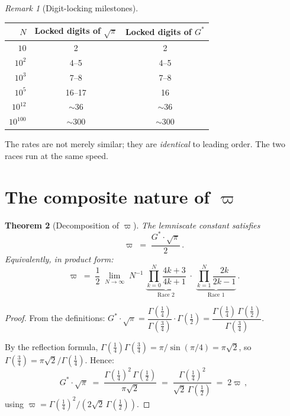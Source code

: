 \documentclass[12pt,reqno]{amsart}
\newtheorem{theorem}{Theorem}[section]
\theoremstyle{definition}
\theoremstyle{remark}
\newtheorem{remark}[theorem]{Remark}
\newcommand{\Gstar}{G^{\!*}}
\newcommand{\varpiup}{\varpi}
\begin{document}
\begin{remark}[Digit-locking milestones]\label{rem:milestones}
\begin{center}
\begin{tabular}{rcc}
\toprule
$N$ & Locked digits of $\sqrt{\pi}$ & Locked digits of $\Gstar$ \\
\midrule
$10$ & 2 & 2 \\
$10^{2}$ & 4--5 & 4--5 \\
$10^{3}$ & 7--8 & 7--8 \\
$10^{5}$ & 16--17 & 16 \\
$10^{12}$ & $\sim 36$ & $\sim 36$ \\
$10^{100}$ & $\sim 300$ & $\sim 300$ \\
\bottomrule
\end{tabular}
\end{center}
The rates are not merely similar; they are \emph{identical} to leading
order.  The two races run at the same speed.
\end{remark}


\section{The composite nature of $\varpiup$}

\begin{theorem}[Decomposition of $\varpiup$]\label{thm:composite}
The lemniscate constant satisfies
\begin{equation}\label{eq:composite}
  \varpiup \;=\; \frac{\Gstar\cdot\sqrt{\pi}}{2}\,.
\end{equation}
Equivalently, in product form:
\begin{equation}\label{eq:composite-product}
  \varpiup \;=\; \frac{1}{2}\;\lim_{N\to\infty}\;N^{-1}\;
  \underbrace{\prod_{k=0}^{N}\frac{4k+3}{4k+1}}_{\text{Race 2}}
  \;\cdot\;
  \underbrace{\prod_{k=1}^{N}\frac{2k}{2k-1}}_{\text{Race 1}}\,.
\end{equation}
\end{theorem}

\begin{proof}
From the definitions:
$\Gstar\cdot\sqrt{\pi}
= \dfrac{\Gamma(\tfrac14)}{\Gamma(\tfrac34)}\cdot\Gamma(\tfrac12)
= \dfrac{\Gamma(\tfrac14)\,\Gamma(\tfrac12)}{\Gamma(\tfrac34)}$.

By the reflection formula,
$\Gamma(\tfrac14)\Gamma(\tfrac34) = \pi/\!\sin(\pi/4) = \pi\sqrt{2}$,
so $\Gamma(\tfrac34) = \pi\sqrt{2}/\Gamma(\tfrac14)$.  Hence:
\[
  \Gstar\cdot\sqrt{\pi}
  \;=\; \frac{\Gamma(\tfrac14)^{2}\,\Gamma(\tfrac12)}{\pi\sqrt{2}}
  \;=\; \frac{\Gamma(\tfrac14)^{2}}{\sqrt{2}\,\Gamma(\tfrac12)}
  \;=\; 2\varpiup\,,
\]
using $\varpiup = \Gamma(\tfrac14)^{2}/(2\sqrt{2}\,\Gamma(\tfrac12))$.
\end{proof}
\end{document}
